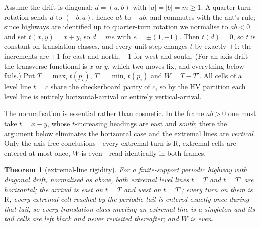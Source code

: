 \documentclass[11pt,reqno]{amsart}
\theoremstyle{plain}
\newtheorem{theorem}{Theorem}[section]
\theoremstyle{definition}
\newcommand{\drift}{d}
\newcommand{\turnR}{\mathrm{R}}
\begin{document}
Assume the drift is diagonal: $\drift=(a,b)$ with $|a|=|b|=m\ge1$. A quarter-turn
rotation sends $\drift$ to $(-b,a)$, hence $ab$ to $-ab$, and commutes with the ant's
rule; since highways are identified up to quarter-turn rotation we normalise to
$ab<0$ and set $t(x,y)=x+y$, so $\drift=me$ with $e=\pm(1,-1)$. Then $t(\drift)=0$,
so $t$ is constant on translation classes, and every unit step changes $t$ by exactly
$\pm1$: the increments are $+1$ for east and north, $-1$ for west and south. (For an
axis drift the transverse functional is $x$ or $y$, which two moves fix, and
everything below fails.) Put $T=\max_i t(p_i)$, $T'=\min_i t(p_i)$ and $W=T-T'$. All
cells of a level line $t=c$ share the checkerboard parity of $c$, so by the HV
partition each level line is entirely horizontal-arrival or entirely vertical-arrival.

The normalisation is essential rather than cosmetic. In the frame $ab>0$ one must take
$t=x-y$, whose $t$-increasing headings are east and \emph{south}; there the argument
below eliminates the horizontal case and the extremal lines are \emph{vertical}. Only
the axis-free conclusions---every extremal turn is $\turnR$, extremal cells are entered
at most once, $W$ is even---read identically in both frames.

\begin{theorem}[extremal-line rigidity]\label{thm:extremal}
For a finite-support periodic highway with diagonal drift, normalised as above, both
extremal level lines $t=T$ and $t=T'$ are horizontal; the arrival is east on $t=T$
and west on $t=T'$; every turn on them is $\turnR$; every extremal cell reached by
the periodic tail is entered exactly once during that tail, so every translation
class meeting an extremal line is a singleton and its tail cells are left black and
never revisited thereafter; and $W$ is even.
\end{theorem}
\end{document}
